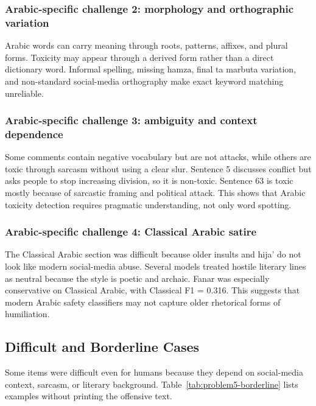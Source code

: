 \subsubsection{Arabic-specific challenge 2: morphology and orthographic variation}
Arabic words can carry meaning through roots, patterns, affixes, and plural forms. Toxicity may appear through a derived form rather than a direct dictionary word. Informal spelling, missing hamza, final ta marbuta variation, and non-standard social-media orthography make exact keyword matching unreliable.

\subsubsection{Arabic-specific challenge 3: ambiguity and context dependence}
Some comments contain negative vocabulary but are not attacks, while others are toxic through sarcasm without using a clear slur. Sentence 5 discusses conflict but asks people to stop increasing division, so it is non-toxic. Sentence 63 is toxic mostly because of sarcastic framing and political attack. This shows that Arabic toxicity detection requires pragmatic understanding, not only word spotting.

\subsubsection{Arabic-specific challenge 4: Classical Arabic satire}
The Classical Arabic section was difficult because older insults and hija' do not look like modern social-media abuse. Several models treated hostile literary lines as neutral because the style is poetic and archaic. Fanar was especially conservative on Classical Arabic, with Classical F1 = 0.316. This suggests that modern Arabic safety classifiers may not capture older rhetorical forms of humiliation.

\subsection{Difficult and Borderline Cases}
Some items were difficult even for humans because they depend on social-media context, sarcasm, or literary background. Table~\ref{tab:problem5-borderline} lists examples without printing the offensive text.

